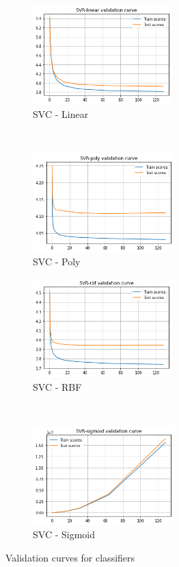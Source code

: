 \documentclass{article}
\begin{document}
\begin{figure}[htb!]
    \centering
    \begin{subfigure}[t]{0.5\textwidth}
        \centering
        \includegraphics[height=1.5in]{img/delta-regression/validation-curves/svc-linear}
        \caption{SVC - Linear}
    \end{subfigure}%
    ~ 
    \begin{subfigure}[t]{0.5\textwidth}
        \centering
        \includegraphics[height=1.5in]{img/delta-regression/validation-curves/svc-poly}
        \caption{SVC - Poly}
    \end{subfigure}

    \centering
    \begin{subfigure}[t]{0.5\textwidth}
        \centering
        \includegraphics[height=1.5in]{img/delta-regression/validation-curves/svc-rbf}
        \caption{SVC - RBF}
    \end{subfigure}%
    ~ 
    \begin{subfigure}[t]{0.5\textwidth}
        \centering
        \includegraphics[height=1.5in]{img/delta-regression/validation-curves/svc-sigmoid}
        \caption{SVC - Sigmoid}
    \end{subfigure}

    \caption{Validation curves for classifiers}
\end{figure}
\end{document}
